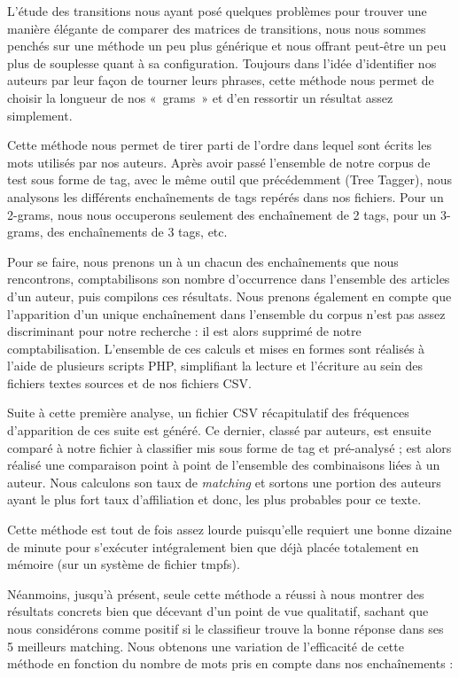 \documentclass[a4paper,12pt]{report}
\begin{document}
L'étude des transitions nous ayant posé quelques problèmes pour trouver une manière élégante de comparer des matrices de transitions, nous nous sommes penchés sur une méthode un peu plus générique et nous offrant peut-être un peu plus de souplesse quant à sa configuration. Toujours dans l'idée d'identifier nos auteurs par leur façon de tourner leurs phrases, cette méthode nous permet de choisir la longueur de nos «~grams~» et d'en ressortir un résultat assez simplement.

Cette méthode nous permet de tirer parti de l'ordre dans lequel sont écrits les mots utilisés par nos auteurs. Après avoir passé l'ensemble de notre corpus de test sous forme de tag, avec le même outil que précédemment (Tree Tagger), nous analysons les différents enchaînements de tags repérés dans nos fichiers. Pour un 2-grams, nous nous occuperons seulement des enchaînement de 2 tags, pour un 3-grams, des enchaînements de 3 tags, etc.

Pour se faire, nous prenons un à un chacun des enchaînements que nous rencontrons, comptabilisons son nombre d'occurrence dans l'ensemble des articles d'un auteur, puis compilons ces résultats. Nous prenons également en compte que l'apparition d'un unique enchaînement dans l'ensemble du corpus n'est pas assez discriminant pour notre recherche : il est alors supprimé de notre comptabilisation. L'ensemble de ces calculs et mises en formes sont réalisés à l'aide de plusieurs scripts PHP, simplifiant la lecture et l'écriture au sein des fichiers textes sources et de nos fichiers CSV.

Suite à cette première analyse, un fichier CSV récapitulatif des fréquences d'apparition de ces suite est généré. Ce dernier, classé par auteurs, est ensuite comparé à notre fichier à classifier mis sous forme de tag et pré-analysé ; est alors réalisé une comparaison point à point de l'ensemble des combinaisons liées à un auteur. Nous calculons son taux de \textit{matching} et sortons une portion des auteurs ayant le plus fort taux d'affiliation et donc, les plus probables pour ce texte. 

Cette méthode est tout de fois assez lourde puisqu'elle requiert une bonne dizaine de minute pour s'exécuter intégralement bien que déjà placée totalement en mémoire (sur un système de fichier tmpfs). 

Néanmoins, jusqu'à présent, seule cette méthode a réussi à nous montrer des résultats concrets bien que décevant d'un point de vue qualitatif, sachant que nous considérons comme positif si le classifieur trouve la bonne réponse dans ses 5 meilleurs matching. Nous obtenons une variation de l'efficacité de cette méthode en fonction du nombre de mots pris en compte dans nos enchaînements :
\end{document}
